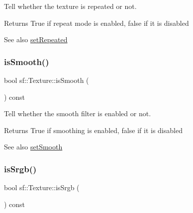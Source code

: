 Tell whether the texture is repeated or not. 

\begin{DoxyReturn}{Returns}
True if repeat mode is enabled, false if it is disabled
\end{DoxyReturn}
\begin{DoxySeeAlso}{See also}
\mbox{\hyperlink{classsf_1_1_texture_aaa87d1eff053b9d4d34a24c784a28658}{set\+Repeated}} \begin{DoxyVerb}\end{DoxyVerb}
 
\end{DoxySeeAlso}
\mbox{\label{classsf_1_1_texture_a3ebb050b5a71e1d40ba66eb1a060e103}} 
\subsubsection{\texorpdfstring{isSmooth()}{isSmooth()}}
{\footnotesize\ttfamily bool sf\+::\+Texture\+::is\+Smooth (\begin{DoxyParamCaption}{ }\end{DoxyParamCaption}) const}



Tell whether the smooth filter is enabled or not. 

\begin{DoxyReturn}{Returns}
True if smoothing is enabled, false if it is disabled
\end{DoxyReturn}
\begin{DoxySeeAlso}{See also}
\mbox{\hyperlink{classsf_1_1_texture_a0c3bd6825b9a99714f10d44179d74324}{set\+Smooth}} \begin{DoxyVerb}\end{DoxyVerb}
 
\end{DoxySeeAlso}
\mbox{\label{classsf_1_1_texture_a9d77ce4f8124abfda96900a6bd53bfe9}} 
\subsubsection{\texorpdfstring{isSrgb()}{isSrgb()}}
{\footnotesize\ttfamily bool sf\+::\+Texture\+::is\+Srgb (\begin{DoxyParamCaption}{ }\end{DoxyParamCaption}) const}



